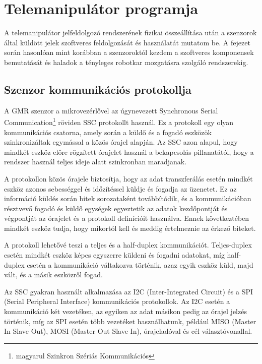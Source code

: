 \chapter{Telemanipulátor programja}
\label{sec:Prog_nagy_fej}

A telemanipulátor jelfeldolgozó rendszerének fizikai összeállítása után a szenzorok által küldött jelek szoftveres feldolgozását és használatát mutatom be. A fejezet során hasonlóan mint korábban a szenzoroktól kezdem a szoftveres komponensek bemutatását és haladok a tényleges robotkar mozgatásra szolgáló rendszerekig.

\section{Szenzor kommunikációs protokollja}
\label{sec:ssc_kom}
A GMR szenzor a mikrovezérlővel az úgynevezett Synchronous Serial Communication\footnote{magyarul Szinkron Szériás Kommunikációs} röviden SSC protokollt használ. Ez a protokoll egy olyan kommunikációs csatorna, amely során a küldő és a fogadó eszközök szinkronizáltak egymással a közös órajel alapján. Az SSC azon alapul, hogy mindkét eszköz előre rögzített órajelet használ a bekapcsolás pillanatától, hogy a rendszer használ teljes ideje alatt szinkronban maradjanak.

A protokollon közös órajele biztosítja, hogy az adat transzferálás esetén mindkét eszköz azonos sebességgel és időzítéssel küldje és fogadja az üzenetet. Ez az információ küldés során bitek sorozataként továbbítódik, és a kommunikációban résztvevő fogadó és küldő egységek egyeztetik az adatok kezdőpontját és végpontját az órajelet és a protokoll definícióit használva. Ennek következtében mindkét eszköz tudja, hogy mikortól kell és meddig értelmeznie az érkező biteket.


A protokoll lehetővé teszi a teljes és a half-duplex kommunikációt. Teljes-duplex esetén mindkét eszköz képes egyszerre küldeni és fogadni adatokat, míg half-duplex esetén a kommunikáció váltakozva történik, azaz egyik eszköz küld, majd vált, és a másik eszközről fogad.

Az SSC gyakran használt alkalmazása az I2C (Inter-Integrated Circuit) és a SPI (Serial Peripheral Interface) kommunikációs protokollok. Az I2C esetén a kommunikáció két vezetéken, az egyiken az adat másikon pedig az órajel jelzés  történik, míg az SPI esetén több vezetéket használhatunk, például MISO (Master In Slave Out), MOSI (Master Out Slave In), órajeladóval és cél választóvonallal.

